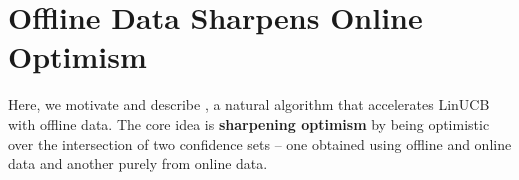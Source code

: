 


\section{Offline Data Sharpens Online Optimism}\label{sec:local-ucb}

Here, we motivate and describe , a natural algorithm that accelerates LinUCB with offline data. The core idea is \textbf{sharpening optimism} by being optimistic over the intersection of two confidence sets -- one obtained using offline and online data and another purely from online data. 

